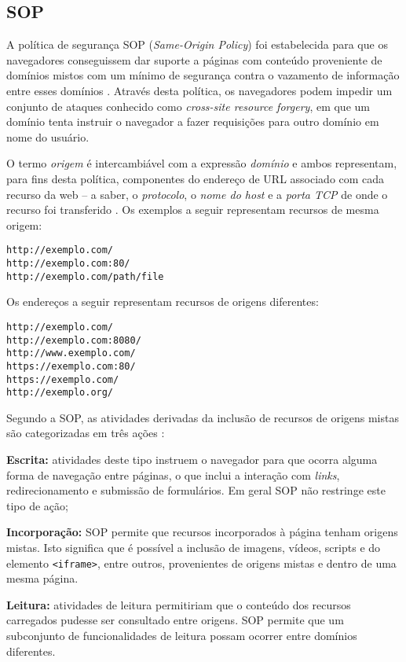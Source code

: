 \subsection{SOP}
A política de segurança SOP (\textit{Same-Origin Policy}) foi estabelecida para que os navegadores conseguissem dar suporte a páginas com conteúdo proveniente de domínios mistos com um mínimo de segurança contra o vazamento de informação entre esses domínios \cite{Hill2016}. Através desta política, os navegadores podem impedir um conjunto de ataques conhecido como \textit{cross-site resource forgery}, em que um domínio tenta instruir o navegador a fazer requisições para outro domínio em nome do usuário.

O termo \textit{origem} é intercambiável com a expressão \textit{domínio} e ambos representam, para fins desta política, componentes do endereço de URL associado com cada recurso da web -- a saber, o \textit{protocolo}, o \textit{nome do host} e a \textit{porta TCP} de onde o recurso foi transferido \cite{Barth2011}. Os exemplos a seguir representam recursos de mesma origem:

\indent\texttt{http://exemplo.com/}\\
\indent\texttt{http://exemplo.com:80/}\\
\indent\texttt{http://exemplo.com/path/file}

Os endereços a seguir representam recursos de origens diferentes:

\indent\texttt{http://exemplo.com/}\\
\indent\texttt{http://exemplo.com:8080/}\\
\indent\texttt{http://www.exemplo.com/}\\
\indent\texttt{https://exemplo.com:80/}\\
\indent\texttt{https://exemplo.com/}\\
\indent\texttt{http://exemplo.org/}

Segundo a SOP, as atividades derivadas da inclusão de recursos de origens mistas são categorizadas em três ações \cite{Ruderman2017}:

\begin{alineas}
	\item \textbf{Escrita:} atividades deste tipo instruem o navegador para que ocorra alguma forma de navegação entre páginas, o que inclui a interação com \textit{links}, redirecionamento e submissão de formulários. Em geral SOP não restringe este tipo de ação;
	\item \textbf{Incorporação:} SOP permite que recursos incorporados à página tenham origens mistas. Isto significa que é possível a inclusão de imagens, vídeos, scripts e do elemento \texttt{<iframe>}, entre outros, provenientes de origens mistas e dentro de uma mesma página.
	\item \textbf{Leitura:} atividades de leitura permitiriam que o conteúdo dos recursos carregados pudesse ser consultado entre origens. SOP permite que um subconjunto de funcionalidades de leitura possam ocorrer entre domínios diferentes.
\end{alineas}

